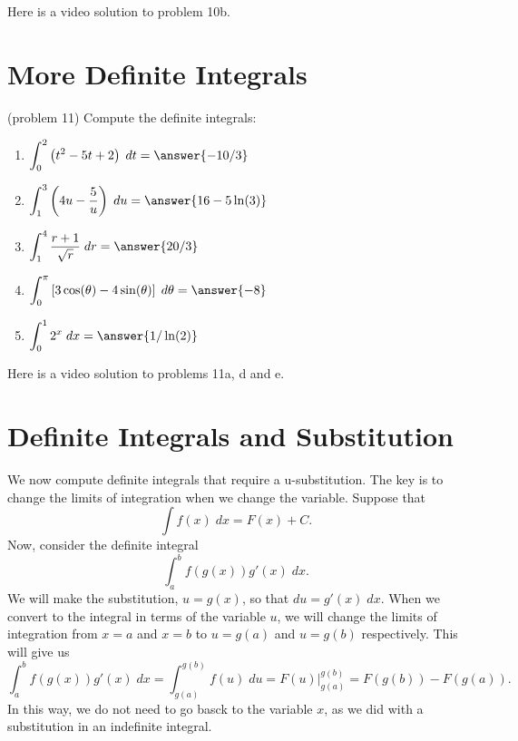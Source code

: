 \documentclass[handout]{ximera}
\begin{document}
Here is a video solution to problem 10b.
\begin{foldable}
\end{foldable}

\begin{center}
\begin{foldable}
\end{foldable}
\end{center}

\section{More Definite Integrals}


\begin{problem}(problem 11) Compute the definite integrals:
\begin{enumerate}
\item[11a)] \; $\displaystyle{\int_0^2 \left(t^2 - 5t + 2\right) \; dt = \answer{-10/3}}$
\item[11b)] \; $\displaystyle{\int_1^ 3 \left(4u - \frac{5}{u}\right) \; du = \answer{16 - 5\ln(3)}}$
\item[11c)] \; $\displaystyle{\int_1^4 \frac{r + 1}{\sqrt r} \; dr = \answer{20/3}}$
\item[11d)] \; $\displaystyle{\int_0^\pi \left[3\cos(\theta) - 4\sin(\theta)\right] \; d\theta = \answer{-8}}$
\item[11e)] \; $\displaystyle{\int_0^1 2^x \; dx = \answer{1/\ln(2)}}$
\end{enumerate}
\end{problem}

Here is a video solution to problems 11a, d and e.
\begin{foldable}
\end{foldable}

\section{Definite Integrals and Substitution}
We now compute definite integrals that require a u-substitution. The key is to change the limits of integration when we change the variable.
Suppose that
\[
\int f(x) \; dx = F(x) + C.
\]
Now, consider the definite integral
\[
\int_a^b f(g(x)) g'(x) \; dx.
\]
We will make the substitution, $u = g(x)$, so that $du = g'(x) \; dx$.
When we convert to the integral in terms of the variable $u$, we will change the limits of integration from $x = a$ and $x = b$ 
to $u = g(a)$ and $u = g(b)$ respectively. This will give us
\[\int_a^b f(g(x)) g'(x) \; dx = \int_{g(a)}^{g(b)} f(u) \; du = F(u)\bigg|_{g(a)}^{g(b)} = F(g(b)) - F(g(a)).\]
In this way, we do not need to go basck to the variable $x$, as we did with a substitution in an indefinite integral.
\end{document}
